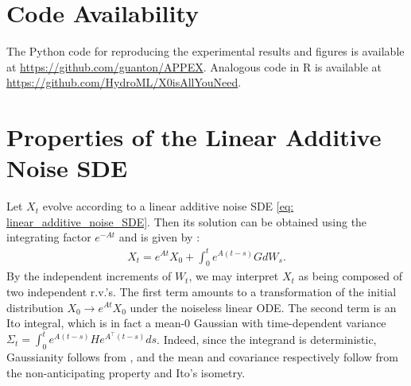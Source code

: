 \documentclass[twoside,11pt]{article}
\begin{document}

\section*{Code Availability}
The Python code for reproducing the experimental results and figures is available at \url{https://github.com/guanton/APPEX}. Analogous code in R is available at \url{https://github.com/HydroML/X0isAllYouNeed}.






\newpage

\appendix

\section{Properties of the Linear Additive Noise SDE}
\label{sec:linear_additive_noise}
Let $X_t$ evolve according to a linear additive noise SDE \eqref{eq: linear_additive_noise_SDE}. Then its solution can be obtained using the integrating factor $e^{-At}$ \cite[Sec 4.3]{sarkka2019applied} and is given by \citep[Sec 4.3]{sarkka2019applied}: 
\begin{align}
X_t = e^{At}X_0 + \int_0^t e^{A(t-s)}GdW_s.
\end{align}
By the independent increments of $W_t$, we may interpret $X_t$ as being composed of two independent r.v.'s. The first term amounts to a transformation of the initial distribution $X_0 \to e^{At}X_0$ under the noiseless linear ODE. The second term is an Ito integral, which is in fact a mean-$0$ Gaussian with time-dependent variance $\Sigma_t = \int_0^t e^{A(t-s)}He^{A^\top (t-s)}ds$. Indeed, since the integrand is deterministic, Gaussianity follows from \citep[Theorem A.7]{oksendal2013stochastic}, and the mean and covariance respectively follow from the non-anticipating property and Ito's isometry.
\end{document}
